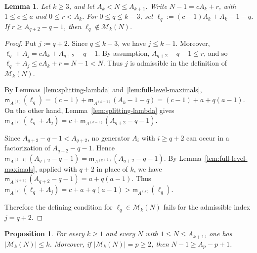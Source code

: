 \documentclass[12pt,a4paper]{amsart}
\newtheorem{lemma}[theorem]{Lemma}
\newtheorem{proposition}[theorem]{Proposition}
\theoremstyle{definition}
\begin{document}
\begin{lemma}\label{lem:interband-elimination}
Let $k\ge 3$, and let $A_k<N\le A_{k+1}$. Write $N-1=cA_k+r$, with $1\le c\le a$ and $0\le r<A_k$. For $0\le q\le k-3$, set $\ell_q:=(c-1)A_k+A_k-1-q$. If $r\ge A_{q+2}-q-1$, then $\ell_q\notin\mathcal M_k(N)$.
\end{lemma}

\begin{proof}
Put $j:=q+2$. Since $q\le k-3$, we have $j\le k-1$. Moreover, $\ell_q+A_j=cA_k+A_{q+2}-q-1$. By assumption, $A_{q+2}-q-1\le r$, and so $\ell_q+A_j\le cA_k+r=N-1<N$. Thus $j$ is admissible in the definition of $\mathcal M_k(N)$.

By Lemmas~\ref{lem:splitting-lambda} and~\ref{lem:full-level-maximals}, $\mathsf m_{A^{(k)}}(\ell_q)=(c-1)+\mathsf m_{A^{(k-1)}}(A_k-1-q)=(c-1)+a+q(a-1)$. On the other hand, Lemma~\ref{lem:splitting-lambda} gives $\mathsf m_{A^{(k)}}(\ell_q+A_j)=c+\mathsf m_{A^{(k-1)}}(A_{q+2}-q-1)$.

Since $A_{q+2}-q-1<A_{q+2}$, no generator $A_i$ with $i\ge q+2$ can occur in a factorization of $A_{q+2}-q-1$. Hence $\mathsf m_{A^{(k-1)}}(A_{q+2}-q-1)=\mathsf m_{A^{(q+1)}}(A_{q+2}-q-1)$. By Lemma~\ref{lem:full-level-maximals}, applied with $q+2$ in place of $k$, we have $\mathsf m_{A^{(q+1)}}(A_{q+2}-q-1)=a+q(a-1)$. Thus $\mathsf m_{A^{(k)}}(\ell_q+A_j)=c+a+q(a-1)>\mathsf m_{A^{(k)}}(\ell_q)$.

Therefore the defining condition for $\ell_q\in\mathcal M_k(N)$ fails for the admissible index $j=q+2$.
\end{proof}

\begin{proposition}\label{prop:combinatorial-type-bound}
For every $k\ge 1$ and every $N$ with $1\le N\le A_{k+1}$, one has $|\mathcal M_k(N)|\le k$. Moreover, if $|\mathcal M_k(N)|=p\ge 2$, then $N-1\ge A_p-p+1$.
\end{proposition}
\end{document}
